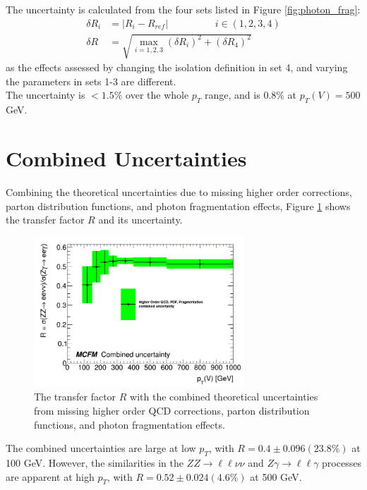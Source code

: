 \documentclass[12pt,a4paper,openright,twoside]{report}
\newcommand{\ZZ}{$ZZ\to \ell\ell\nu\nu$ }
\newcommand{\Zg}{$Z\gamma\to \ell\ell\gamma$ }
\begin{document}
The uncertainty is calculated from the four sets listed in Figure \ref{fig:photon_frag}:
\begin{equation}
\begin{split}
\delta R_i &= |R_i - R_{ref}| \hspace{2cm}  i \in (1,2,3,4)\\
\delta R &= \sqrt{\max_{i=1,2,3}(\delta R_i)^2 + (\delta R_4)^2}
\end{split}
\end{equation}
as the effects assessed by changing the isolation definition in set 4, and varying the parameters in sets 1-3 are different.\\
The uncertainty is $< 1.5\%$ over the whole $p_T$ range, and is 0.8\% at $p_T(V)=500$ GeV.
\vfill

\section{Combined Uncertainties}

Combining the theoretical uncertainties due to missing higher order corrections, parton distribution functions, and photon fragmentation effects, Figure \ref{fig:summary} shows the transfer factor $R$ and its uncertainty.

\begin{figure}[H]
\centering
	\includegraphics[width=0.7\textwidth]{summary.png}
	\caption{The transfer factor $R$ with the combined theoretical uncertainties from missing higher order QCD corrections, parton distribution functions, and photon fragmentation effects.}
	\label{fig:summary}
\end{figure}

The combined uncertainties are large at low $p_T$, with $R=0.4\pm 0.096(23.8\%)$ at 100 GeV. However, the similarities in the \ZZ and \Zg processes are apparent at high $p_T$, with $R=0.52\pm 0.024 (4.6\%)$ at 500 GeV.
\end{document}
